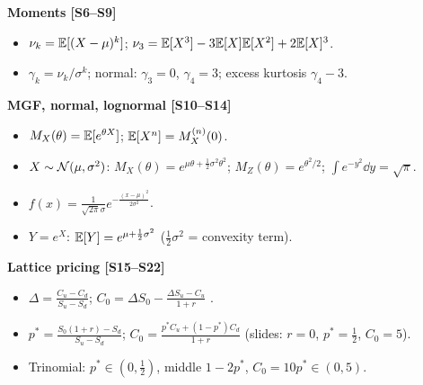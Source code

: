 \documentclass[10pt]{article}
\begin{document}
\textbf{Moments [S6--S9]}
\begin{itemize}
\item $\nu_k=\mathbb{E}[(X-\mu)^k]$; $\nu_3=\mathbb{E}[X^3]-3\mathbb{E}[X]\mathbb{E}[X^2]+2\mathbb{E}[X]^3$.
\item $\gamma_k=\nu_k/\sigma^k$; normal: $\gamma_3=0$, $\gamma_4=3$; excess kurtosis $\gamma_4-3$.
\end{itemize}
\textbf{MGF, normal, lognormal [S10--S14]}
\begin{itemize}
\item $M_X(\theta)=\mathbb{E}[e^{\theta X}]$; $\mathbb{E}[X^n]=M^{(n)}_X(0)$.
\item $X\sim\mathcal{N}(\mu,\sigma^2)$: $M_X(\theta)=e^{\mu\theta+\frac12\sigma^2\theta^2}$; $M_Z(\theta)=e^{\theta^2/2}$; $\int e^{-y^2}\dd y=\sqrt\pi$.
\item $f(x)=\frac{1}{\sqrt{2\pi}\sigma}e^{-\frac{(x-\mu)^2}{2\sigma^2}}$.
\item $Y=e^X$: $\mathbb{E}[Y]=e^{\mu+\frac12\sigma^2}$ ($\frac12\sigma^2$ = convexity term).
\end{itemize}
\textbf{Lattice pricing [S15--S22]}
\begin{itemize}
\item $\Delta=\frac{C_u-C_d}{S_u-S_d}$; $C_0=\Delta S_0-\frac{\Delta S_u-C_u}{1+r}$ \beyond.
\item $p^*=\frac{S_0(1+r)-S_d}{S_u-S_d}$; $C_0=\frac{p^*C_u+(1-p^*)C_d}{1+r}$ (slides: $r=0$, $p^*=\frac12$, $C_0=5$).
\item Trinomial: $p^*\in(0,\frac12)$, middle $1-2p^*$, $C_0=10p^*\in(0,5)$.
\end{itemize}
\end{document}
